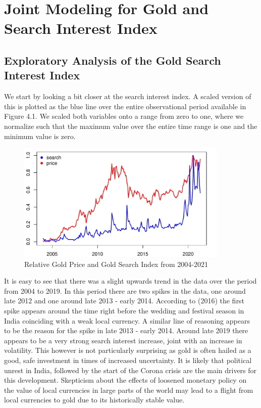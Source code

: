 \documentclass[a4paper]{article}
\theoremstyle{definition}
\begin{document}
\section{Joint Modeling for Gold and Search Interest Index}
\subsection{Exploratory Analysis of the Gold Search Interest Index}
We start by looking a bit closer at the search interest index. A scaled version of this is plotted as the blue line over the entire observational period available in Figure 4.1. We scaled both variables onto a range from zero to one, where we normalize such that the maximum value over the entire time range is one and the minimum value is zero.
	\begin{figure}[!t]
	\centering
	\caption{Relative Gold Price and Gold Search Index from 2004-2021}
	\includegraphics[width=0.90\textwidth]{comparisonPriceSearch}
	\end{figure}
It is easy to see that there was a slight upwards trend in the data over the period from 2004 to 2019. In this period there are two spikes in the data, one around late 2012 and one around late 2013 - early 2014. According to \citeauthor{Desk.24062016} (2016) the first spike appears around the time right before the wedding and festival season in India coinciding with a weak local currency. A similar line of reasoning appears to be the reason for the spike in late 2013 - early 2014. Around late 2019 there appears to be a very strong search interest increase, joint with an increase in volatility. This however is not particularly surprising as gold is often hailed as a good, safe investment in times of increased uncertainty. It is likely that political unrest in India, followed by the start of the Corona crisis are the main drivers for this development. Skepticism about the effects of loosened monetary policy on the value of local currencies in large parts of the world may lead to a flight from local currencies to gold due to its historically stable value. 
%
\end{document}

